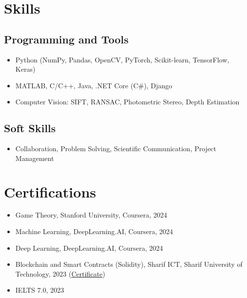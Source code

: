 \documentclass[a4paper,10pt]{article}
\begin{document}
\section*{Skills}
\subsection*{Programming and Tools}
\begin{itemize}
  \item Python (NumPy, Pandas, OpenCV, PyTorch, Scikit-learn, TensorFlow, Keras)
  \item MATLAB, C/C++, Java, .NET Core (C#), Django
  \item Computer Vision: SIFT, RANSAC, Photometric Stereo, Depth Estimation
\end{itemize}

\subsection*{Soft Skills}
\begin{itemize}
  \item Collaboration, Problem Solving, Scientific Communication, Project Management
\end{itemize}

\section*{Certifications}
\begin{itemize}
  \item Game Theory, Stanford University, Coursera, 2024
  \item Machine Learning, DeepLearning.AI, Coursera, 2024
  \item Deep Learning, DeepLearning.AI, Coursera, 2024
  \item Blockchain and Smart Contracts (Solidity), Sharif ICT, Sharif University of Technology, 2023 (\href{https://ibb.co/R2Zf8kk}{Certificate})
  \item IELTS 7.0, 2023
\end{itemize}
\end{document}
